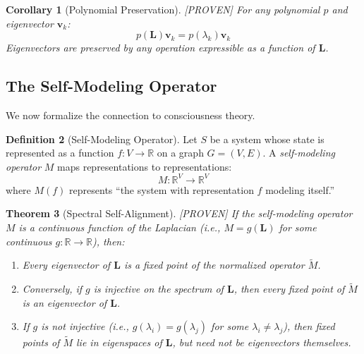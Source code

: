 \documentclass[11pt,a4paper]{article}
\newtheorem{theorem}{Theorem}[section]
\newtheorem{corollary}[theorem]{Corollary}
\theoremstyle{definition}
\newtheorem{definition}[theorem]{Definition}
\theoremstyle{remark}
\newcommand{\R}{\mathbb{R}}
\newcommand{\Lap}{\mathbf{L}}
\newcommand{\proven}{\textcolor{green!50!black}{[PROVEN]}}
\begin{document}
\begin{corollary}[Polynomial Preservation] \proven
For any polynomial $p$ and eigenvector $\mathbf{v}_k$:
\[
p(\Lap) \mathbf{v}_k = p(\lambda_k) \mathbf{v}_k
\]
Eigenvectors are preserved by any operation expressible as a function of $\Lap$.
\end{corollary}

\subsection{The Self-Modeling Operator}

We now formalize the connection to consciousness theory.

\begin{definition}[Self-Modeling Operator]
Let $S$ be a system whose state is represented as a function $f: V \to \R$ on a graph $G = (V, E)$. A \emph{self-modeling operator} $M$ maps representations to representations:
\[
M: \R^V \to \R^V
\]
where $M(f)$ represents ``the system with representation $f$ modeling itself.''
\end{definition}

\begin{theorem}[Spectral Self-Alignment] \proven
\label{thm:spectral-self-alignment}
If the self-modeling operator $M$ is a continuous function of the Laplacian (i.e., $M = g(\Lap)$ for some continuous $g: \R \to \R$), then:
\begin{enumerate}[label=(\roman*)]
    \item Every eigenvector of $\Lap$ is a fixed point of the normalized operator $\tilde{M}$.
    \item Conversely, if $g$ is injective on the spectrum of $\Lap$, then every fixed point of $\tilde{M}$ is an eigenvector of $\Lap$.
    \item If $g$ is not injective (i.e., $g(\lambda_i) = g(\lambda_j)$ for some $\lambda_i \neq \lambda_j$), then fixed points of $\tilde{M}$ lie in eigenspaces of $\Lap$, but need not be eigenvectors themselves.
\end{enumerate}
\end{theorem}
\end{document}
